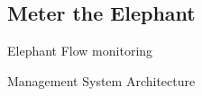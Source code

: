 \documentclass[aspectratio=43]{beamer}
\begin{document}
\subsection{Meter the Elephant}

\begin{frame}[plain]
    \centering
        \Huge{Elephant Flow monitoring}
\end{frame}


\begin{frame}{Management System Architecture}
\end{frame}
\end{document}
